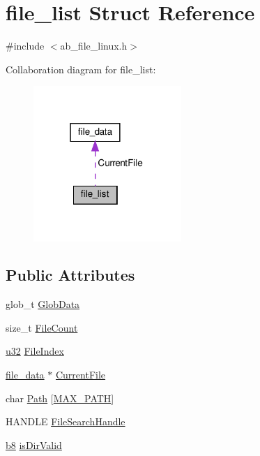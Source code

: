 \hypertarget{structfile__list}{}\section{file\+\_\+list Struct Reference}
\label{structfile__list}


{\ttfamily \#include $<$ab\+\_\+file\+\_\+linux.\+h$>$}



Collaboration diagram for file\+\_\+list\+:\nopagebreak
\begin{figure}[H]
\begin{center}
\leavevmode
\includegraphics[width=159pt]{d8/df1/structfile__list__coll__graph}
\end{center}
\end{figure}
\subsection*{Public Attributes}
\begin{DoxyCompactItemize}
\item 
glob\+\_\+t \hyperlink{structfile__list_a8b9c52b0dbeb615a3d2ec8c4e75fce49}{Glob\+Data}
\item 
size\+\_\+t \hyperlink{structfile__list_a1f88f1b450c176c81c7ffdd7d5334429}{File\+Count}
\item 
\hyperlink{ab__common_8h_afaa62991928fb9fb18ff0db62a040aba}{u32} \hyperlink{structfile__list_a18a2bcd2708d290b02cb3a80a3f68d48}{File\+Index}
\item 
\hyperlink{structfile__data}{file\+\_\+data} $\ast$ \hyperlink{structfile__list_a8103a737b7c8edc9da8dfa5c75abe242}{Current\+File}
\item 
char \hyperlink{structfile__list_a50f2703df63faf3266542b422b417cd9}{Path} \mbox{[}\hyperlink{ab__file_8h_ab99ded389af74001a6298fc9e44e74e5}{M\+A\+X\+\_\+\+P\+A\+TH}\mbox{]}
\item 
H\+A\+N\+D\+LE \hyperlink{structfile__list_a890b377545055c3acb0d705ea20a13c4}{File\+Search\+Handle}
\item 
\hyperlink{ab__common_8h_a70e369648385b50f2d0588e8e8745275}{b8} \hyperlink{structfile__list_ab563e99003e66a0dbee5f5e4a4129b84}{is\+Dir\+Valid}
\end{DoxyCompactItemize}


